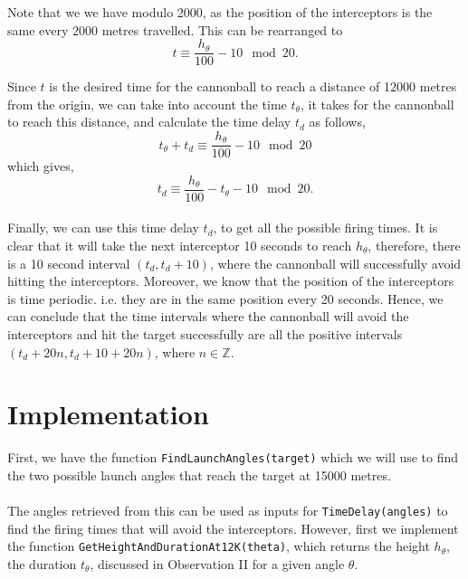 \documentclass[11pt]{report}
\begin{document}
Note that we we have modulo 2000, as the position of the interceptors is the same every 2000 metres travelled. This can be rearranged to $$t \equiv \frac{h_{\theta}}{100} - 10 \mod 20.$$

Since $t$ is the desired time for the cannonball to reach a distance of 12000 metres from the origin, we can take into account the time $t_{\theta}$, it takes for the cannonball to reach this distance, and calculate the time delay $t_d$ as follows, $$ t_{\theta} + t_d \equiv \frac{h_{\theta}}{100} - 10 \mod 20$$ which gives, 
\begin{equation}
	t_d \equiv \frac{h_{\theta}}{100} - t_{\theta} - 10 \mod 20.
	\label{eq:timedelay}
\end{equation} \\

Finally, we can use this time delay $t_d$, to get all the possible firing times. It is clear that it will take the next interceptor 10 seconds to reach $h_{\theta}$, therefore, there is a 10 second interval $(t_d, t_d + 10)$, where the cannonball will successfully avoid hitting the interceptors. Moreover, we know that the position of the interceptors is time periodic. i.e. they are in the same position every 20 seconds. Hence, we can conclude that the time intervals where the cannonball will avoid the interceptors and hit the target successfully are all the positive intervals $(t_d+20n, t_d+10+20n)$, where $n\in \mathbb{Z}$. 

\section{Implementation}
First, we have the function \texttt{FindLaunchAngles(target)} which we will use to find the two possible launch angles that reach the target at 15000 metres. \\


\ \\
The angles retrieved from this can be used as inputs for \texttt{TimeDelay(angles)} to find the firing times that will avoid the interceptors. However, first we implement the function \texttt{GetHeightAndDurationAt12K(theta)}, which returns the height $h_{\theta}$, the duration $t_{\theta}$, discussed in Observation II for a given angle $\theta$. \\


\end{document}
